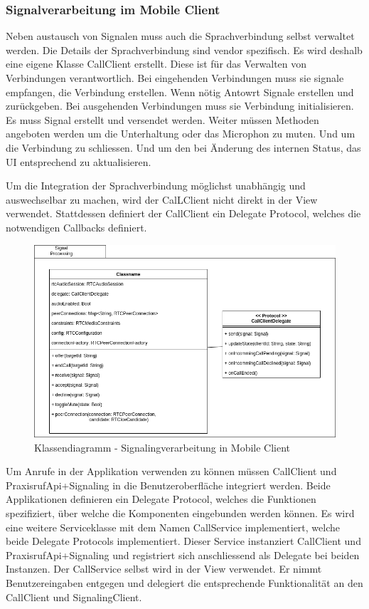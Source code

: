 \subsubsection{Signalverarbeitung im Mobile Client}

Neben austausch von Signalen muss auch die Sprachverbindung selbst verwaltet werden.
Die Details der Sprachverbindung sind vendor spezifisch.
Es wird deshalb eine eigene Klasse CallClient erstellt.
Diese ist für das Verwalten von Verbindungen verantwortlich.
Bei eingehenden Verbindungen muss sie signale empfangen, die Verbindung erstellen.
Wenn nötig Antowrt Signale erstellen und zurückgeben.
Bei ausgehenden Verbindungen muss sie Verbindung initialisieren.
Es muss Signal erstellt und versendet werden.
Weiter müssen Methoden angeboten werden um die Unterhaltung oder das Microphon zu muten.
Und um die Verbindung zu schliessen.
Und um den bei Änderung des internen Status, das UI entsprechend zu aktualisieren.

Um die Integration der Sprachverbindung möglichst unabhängig und auswechselbar zu machen, wird der CalLClient nicht direkt in der View verwendet.
Stattdessen definiert der CallClient ein Delegate Protocol, welches die notwendigen Callbacks definiert.

\begin{figure}[h]
    \centering
    \begin{minipage}[b]{0.9\textwidth}
        \includegraphics[width=\textwidth]{graphics/diagramms/Class_Mobile_Client_Signal_Processing}
        \caption{Klassendiagramm - Signalingverarbeitung in Mobile Client}
    \end{minipage}
\end{figure}

Um Anrufe in der Applikation verwenden zu können müssen CallClient und PraxisrufApi+Signaling in die Benutzeroberfläche integriert werden.
Beide Applikationen definieren ein Delegate Protocol, welches die Funktionen spezifiziert, über welche die Komponenten eingebunden werden können.
Es wird eine weitere Serviceklasse mit dem Namen CallService implementiert, welche beide Delegate Protocols implementiert.
Dieser Service instanziert CallClient und PraxisrufApi+Signaling und registriert sich anschliessend als Delegate bei beiden Instanzen.
Der CallService selbst wird in der View verwendet.
Er nimmt Benutzereingaben entgegen und delegiert die entsprechende Funktionalität an den CallClient und SignalingClient.

